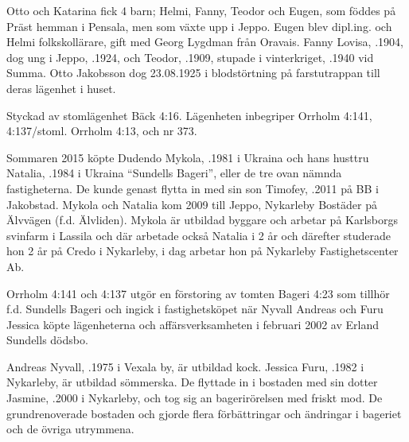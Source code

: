 Otto och Katarina fick 4 barn; Helmi, Fanny, Teodor och Eugen, som föddes på Präst hemman i Pensala, men som växte upp i Jeppo. Eugen blev dipl.ing. och Helmi folkskollärare, gift med Georg Lygdman från Oravais. Fanny Lovisa, .1904, dog ung i Jeppo, .1924, och Teodor, .1909, stupade i vinterkriget, .1940 vid Summa. Otto Jakobsson dog 23.08.1925 i blodstörtning på farstutrappan till deras lägenhet i huset.



%

Styckad av stomlägenhet Bäck 4:16. Lägenheten inbegriper Orrholm 4:141, 4:137/stoml. Orrholm 4:13, och nr 373.


%
Sommaren 2015 köpte Dudendo Mykola, .1981 i Ukraina och hans husttru Natalia, .1984 i Ukraina ``Sundells Bageri'', eller de tre ovan nämnda fastigheterna. De kunde genast flytta in med sin son Timofey, .2011 på BB i Jakobstad. Mykola och Natalia kom 2009 till Jeppo, Nykarleby Bostäder på Älvvägen (f.d. Älvliden). Mykola är utbildad byggare och arbetar på Karlsborgs svinfarm i Lassila och där arbetade också Natalia i 2 år och därefter studerade hon 2 år på Credo i Nykarleby, i dag arbetar hon på Nykarleby Fastighetscenter Ab.


%
Orrholm  4:141 och 4:137 utgör en förstoring av tomten Bageri 4:23 som tillhör f.d. Sundells Bageri och ingick i fastighetsköpet när Nyvall Andreas och Furu Jessica köpte lägenheterna och affärsverksamheten i februari 2002 av Erland Sundells dödsbo.

Andreas Nyvall, .1975 i Vexala by, är utbildad kock. Jessica Furu, .1982 i Nykarleby, är utbildad sömmerska. De flyttade in i bostaden med sin dotter Jasmine, .2000 i Nykarleby, och tog sig an bagerirörelsen med friskt mod. De grundrenoverade bostaden och gjorde flera förbättringar och ändringar i bageriet och de övriga utrymmena.


